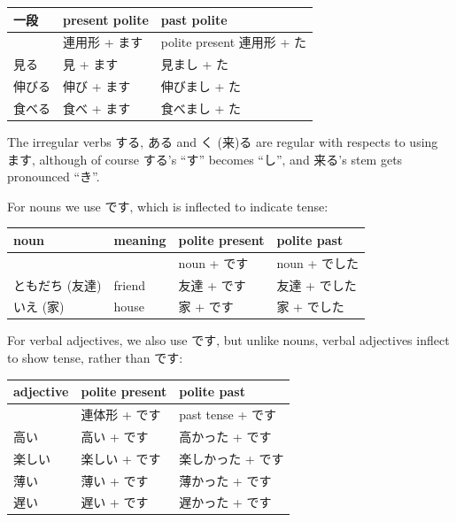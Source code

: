 \documentclass[11pt, b5paper, twoside, openright, onecolumn]{book}
\makeatletter
\newcommand*{\rtrubystack}[2]{{\relscale{0.5}%
  \begin{tabular}[b]{@{}c@{}}%
    {#1}\\%
    {\textscale{2}{#2}}%
  \end{tabular}}%
}
\DeclareRobustCommand*{\rtruby}[2]{%
  \mbox{%
    \setlength{\parskip}{0ex}%
    \BeginAccSupp{method=pdfstringdef,ActualText={#1}}%
      \rtrubystack{\phantom{#2}}{#1}%
      \llap{%
        \rtrubystack{#2}{\phantom{#1}}%
      }%
    \EndAccSupp{}%
  }%
}
\newcommand*{\rubystack}[2]{{\relscale{0.5}%
  \begin{tabular}[b]{@{}c@{}}%
    {#1}\\%
   {\textscale{2}{#2}}%
  \end{tabular}}%
}
\DeclareRobustCommand*{\ruby}[2]{%
  \mbox{%
    \setlength{\parskip}{0ex}%
    \BeginAccSupp{method=pdfstringdef,ActualText={#1}}%
      \rubystack{\phantom{#2}}{#1}%
      \llap{%
        \rubystack{#2}{\phantom{#1}}%
      }%
    \EndAccSupp{}%
  }%
}
\renewcommand*{\rtruby}[2]{#2 (#1)}%
\renewcommand*{\ruby}[2]{#2 (#1)}%
\newenvironment{mytabular}[1]{\noindent\hspace{0.4in}
\begin{tabular}[h]{#1}}{\end{tabular}}
\makeatother
\begin{document}
\smaller
\begin{mytabular}{| l  l  l |}\hline 
\rule{0pt}{2.4ex}一段 & present polite & past polite\\ 
\hline
\rule{0pt}{2.4ex} & 連用形 + ます & polite present 連用形 + た\\ 
\rule{0pt}{2.4ex}見る & 見 + ます & 見まし + た\\ 
\rule{0pt}{2.4ex}伸びる & 伸び + ます & 伸びまし + た\\ 
\rule{0pt}{2.4ex}食べる & 食べ + ます & 食べまし + た\\ 
\hline 
\end{mytabular}
\larger
\vspace{0.5cm}


The irregular verbs する‚ ある and \ruby{来}{く}る are regular with respects to using ます‚ although of course する’s “す” becomes “し”‚ and 来る’s stem gets pronounced “き”.

For nouns we use です‚ which is inflected to indicate tense:

\vspace{0.5cm}
\smaller
\begin{mytabular}{| l  l  l  l |}\hline 
\rule{0pt}{2.4ex}noun & meaning & polite present & polite past\\ 
\hline
\rule{0pt}{2.4ex} &  & noun + です & noun + でした\\ 
\rule{0pt}{3.6ex}\rtruby{友達}{ともだち} & friend & 友達 + です & 友達 + でした\\ 
\rule{0pt}{3.6ex}\rtruby{家}{いえ} & house & 家 + です & 家 + でした\\ 
\hline 
\end{mytabular}
\larger
\vspace{0.5cm}


For verbal adjectives‚ we also use です‚ but unlike nouns‚ verbal adjectives inflect to show tense‚ rather than です:

\vspace{0.5cm}
\smaller
\begin{mytabular}{| l  l  l |}\hline 
\rule{0pt}{2.4ex}adjective & polite present & polite past\\ 
\hline
\rule{0pt}{2.4ex} & 連体形 + です & past tense + です\\ 
\rule{0pt}{2.4ex}高い & 高い + です & 高かった + です\\ 
\rule{0pt}{2.4ex}楽しい & 楽しい + です & 楽しかった + です\\ 
\rule{0pt}{2.4ex}薄い & 薄い + です & 薄かった + です\\ 
\rule{0pt}{2.4ex}遅い & 遅い + です & 遅かった + です\\ 
\hline 
\end{mytabular}
\larger
\vspace{0.5cm}
\end{document}
